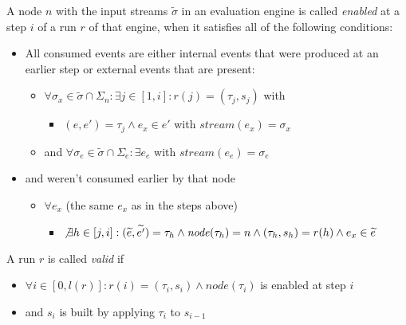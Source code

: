 \begin{definition}[name = Enabledness of a Node]\label{def:node_enabled}
  A node \(n\) with the input streams \(\widetilde{\sigma}\) in an evaluation engine is called \emph{enabled} at a step \(i\) of a run \(r\) of that engine, when it satisfies all of the following conditions:

  \begin{itemize}
    \item All consumed events are either internal events that were produced at an earlier step or external events that are present:
      \begin{itemize}
        \item \(\forall \sigma_x \in \widetilde{\sigma} \cap \Sigma_n: \exists j \in [1, i]: r(j) = (\tau_j, s_j)\) with
          \begin{itemize}
            \item\( (e, e') = \tau_j \land e_x \in e'\) with \(\mathit{stream}(e_x) = \sigma_x \)
          \end{itemize}
        \item and \(\forall \sigma_e \in \widetilde{\sigma} \cap\Sigma_e:\exists e_e\) with \(\mathit{stream}(e_e) = \sigma_e\)
      \end{itemize}
    \item and weren't consumed earlier by that node
      \begin{itemize}
        \item \(\forall e_x\) (the same \(e_x\) as in the steps above)
          \begin{itemize}
            \item \(\not\exists h \in [j, i]: (\widetilde{e}, \widetilde{e'}) = \tau_h \land \mathit{node}(\tau_h) = n \land (\tau_h, s_h) = r(h) \land e_x \in \widetilde{e}\)
          \end{itemize}
      \end{itemize}
  \end{itemize}
\end{definition}

\begin{definition}[name = Valid Run]\label{def:valid_run}
  A run \(r\) is called \emph{valid} if
  \begin{itemize}
    \item \(\forall i \in [0,l(r)]: r(i) = (\tau_i,s_i) \land \mathit{node}(\tau_i)\) is enabled at step \(i\)
    \item and \(s_i\) is built by applying \(\tau_i\) to \(s_{i-1}\)
  \end{itemize}
\end{definition}

